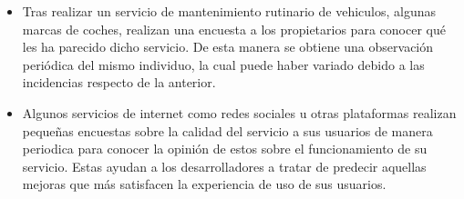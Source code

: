 \documentclass{article}
\begin{document}
    \begin{itemize}

      \item Tras realizar un servicio de mantenimiento rutinario de vehiculos, algunas marcas de coches, realizan una encuesta a los propietarios para conocer qué les ha parecido dicho servicio. De esta manera se obtiene una observación periódica del mismo individuo, la cual puede haber variado debido a las incidencias respecto de la anterior.

      \item Algunos servicios de internet como redes sociales u otras plataformas realizan pequeñas encuestas sobre la calidad del servicio a sus usuarios de manera periodica para conocer la opinión de estos sobre el funcionamiento de su servicio. Estas ayudan a los desarrolladores a tratar de predecir aquellas mejoras que más satisfacen la experiencia de uso de sus usuarios.

    \end{itemize}
	\nocite{muest2017}
  \nocite{wiki:Panel_data}
  \nocite{wiki:Panel_analysis}
  \nocite{de2007tipos}

  
  
\end{document}
